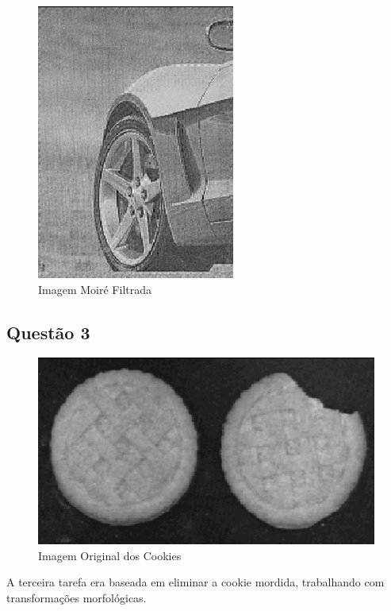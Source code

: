 \documentclass[conference]{IEEEtran}
\begin{document}
\begin{figure}[h]
    \centering
    \includegraphics[scale=0.7]{data/filtered2.png}
    \caption{Imagem Moiré Filtrada}
    \label{fig8}
\end{figure}

\subsection{Questão 3}

\begin{figure}[h]
    \centering
    \includegraphics[scale=0.6]{data/cookies.png}
    \caption{Imagem Original dos Cookies}
    \label{fig9}
\end{figure}

A terceira tarefa era baseada em eliminar a cookie mordida, trabalhando
com transformações morfológicas.
\end{document}
